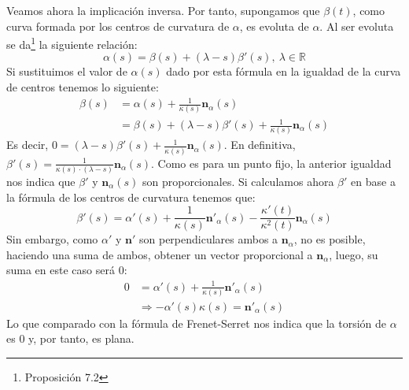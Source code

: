 Veamos ahora la implicación inversa. Por tanto, supongamos que $\beta\left( t
\right)$, como curva formada por los centros de curvatura de $\alpha$, es
evoluta de $\alpha$. Al ser evoluta se da\footnote{Proposición
7.2\cite{sanjurjo}} la siguiente relación:
\[
\alpha\left( s \right) = \beta\left( s \right) + \left( \lambda - s \right)
\beta'\left( s \right),\ \lambda \in \mathbb{R}
\]
Si sustituimos el valor de $\alpha\left( s \right)$ dado por esta fórmula en la
igualdad de la curva de centros tenemos lo siguiente:
\begin{align*}
    \beta\left( s \right) &= \alpha\left( s \right) + \frac{1}{\kappa\left( s
    \right)} \mathbf{n}_{\alpha}\left( s \right)\\
    &= \beta\left( s \right) + \left( \lambda - s \right) \beta'\left( s
    \right) + \frac{1}{\kappa\left( s \right)} \mathbf{n}_{\alpha}\left( s \right)
\end{align*}
Es decir, $0 = \left( \lambda - s \right)\beta'\left( s \right) +
\frac{1}{\kappa\left( s \right)} \mathbf{n}_{\alpha}\left( s \right)$. En
definitiva, $\beta'\left( s \right) = \frac{1}{\kappa\left( s \right) \cdot
\left( \lambda - s \right)} \mathbf{n}_{\alpha}\left( s \right)$. Como es para
un punto fijo, la anterior igualdad nos indica que $\beta'$ y
$\mathbf{n}_{\alpha}\left( s \right)$ son proporcionales. %
Si calculamos ahora $\beta'$ en base a la fórmula de los centros de curvatura
tenemos que:
\[
\beta'\left( s \right) = \alpha'\left( s \right) + \frac{1}{\kappa\left( s
\right)} \mathbf{n}'_{\alpha}\left( s \right) - \frac{\kappa'\left( t
\right)}{\kappa^2\left( t \right)} \mathbf{n}_{\alpha}\left( s \right)
\]
Sin embargo, como $\alpha'$ y $\mathbf{n}'$ son perpendiculares ambos a
$\mathbf{n}_{\alpha}$, no es posible, haciendo una suma de ambos, obtener un
vector proporcional a $\mathbf{n}_{\alpha}$, luego, su suma en este caso será
$0$:
\begin{align*}
    0 &= \alpha'\left( s \right) + \frac{1}{\kappa\left( s
\right)}\mathbf{n}'_{\alpha}\left( s \right)\\
      &\Rightarrow -\alpha'\left( s \right) \kappa\left( s \right) =
      \mathbf{n}'_{\alpha}\left( s \right)
\end{align*}
Lo que comparado con la fórmula de Frenet-Serret nos indica que la torsión de
$\alpha$ es $0$ y, por tanto, es plana.
